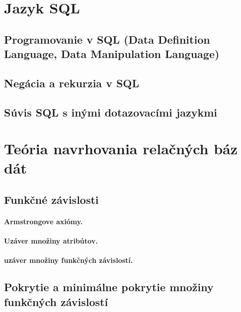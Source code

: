 \documentclass[10pt,a4paper]{article}
\begin{document}
\section{Jazyk SQL} 
\subsection{Programovanie v SQL (Data Definition Language, Data Manipulation Language)}
\subsection{Negácia a rekurzia v SQL}
\subsection{Súvis SQL s inými dotazovacími jazykmi}
    
\section{Teória navrhovania relačných báz dát} 

\subsection{Funkčné závislosti}
\paragraph{Armstrongove axiómy.} 
\paragraph{Uzáver množiny atribútov.}
\paragraph{uzáver množiny funkčných závislostí.}

\subsection{Pokrytie a minimálne pokrytie množiny funkčných závislostí}
\end{document}
